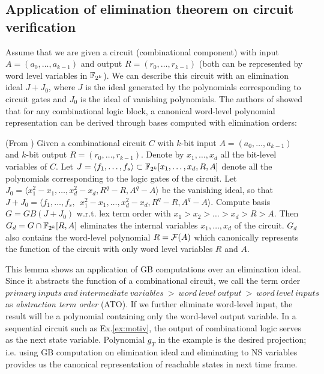 \subsection{Application of elimination theorem on circuit verification}
\label{sec:elim}
Assume that we are given a circuit (combinational component) with input $A = (a_0,\dots,a_{k-1})$ and output 
$R = (r_0,\dots,r_{k-1})$ (both can be represented
by word level variables in ${\mathbb{F}}_{2^k}$). We can describe this circuit with an elimination ideal $J+J_0$, where
$J$ is the ideal generated by the polynomials corresponding to circuit gates and $J_0$ is the ideal of vanishing polynomials.
The authors of \cite{timDAC} showed that for any combinational
logic block, a canonical word-level polynomial representation can be
derived through \Grobner bases computed with elimination orders:
\begin{Lemma}
(From \cite{timDAC}) Given a combinational circuit $C$ with $k$-bit
  input $A = (a_0, \dots, a_{k-1})$ and $k$-bit output $R = (r_0, \dots,
  r_{k-1})$. Denote by $x_1, \dots, x_d$ all the bit-level
  variables of   $C$. Let $J = \langle f_1, \dots, f_s \rangle \subset
  {\mathbb{F}}_{2^k}[x_1, \dots, x_d, R, A]$ denote all the polynomials corresponding to the
  logic gates of the circuit. Let $J_0 = \langle x_1^2 - x_1, \dots,
  x_d^2 - x_d, R^q - R, A^q - A \rangle$ be the vanishing ideal, so
  that $J + J_0 = \langle f_1, \dots, f_s, ~~ x_1^2 - x_1, \dots,
  x_d^2 - x_d, R^q - R, A^q - A \rangle$. Compute \Grobner basis $G =
  GB(J + J_0)$ w.r.t. lex term order with $x_1 > x_2 > \dots > x_d > R
  > A$. Then $G_d = G \cap {\mathbb{F}}_{2^k}[R, A]$ eliminates the internal
  variables $x_1, \dots, x_d$ of the circuit. $G_d$ also contains the
  word-level polynomial $R = {\mathcal{F}}(A)$ which canonically represents the
  function of the circuit with only word level variables $R$ and $A$.
\end{Lemma}
This lemma shows an application of GB computations over an elimination ideal.
Since it abstracts the function of a combinational circuit, we call the term order
$primary~inputs~and~intermediate~variables~>~word~level~output~>~word~level~inputs$
as \textit{abstraction term order} (ATO).
If we further eliminate word-level input, the result will be a polynomial containing only 
the word-level output variable. In a sequential circuit
such as Ex.\ref{ex:motiv}, the output of combinational logic serves as the next state variable. Polynomial $g_T$ in
the example is the desired projection; i.e. using GB computation on elimination ideal and eliminating to NS
variables provides us the canonical representation of reachable states in next time frame.



